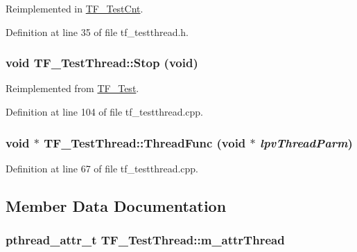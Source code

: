 Reimplemented in \hyperlink{classTF__TestCnt_ac1a136199115958172e96ef4c9212351}{TF\_\-TestCnt}.

Definition at line 35 of file tf\_\-testthread.h.\hypertarget{classTF__TestThread_a3a633a8999b704e85bb197b5fdd63b43}{
\subsubsection[{Stop}]{\setlength{\rightskip}{0pt plus 5cm}void TF\_\-TestThread::Stop (void)}}
\label{classTF__TestThread_a3a633a8999b704e85bb197b5fdd63b43}


Reimplemented from \hyperlink{classTF__Test_a710a0463dee6767fcb3a3e3d191978b7}{TF\_\-Test}.

Definition at line 104 of file tf\_\-testthread.cpp.\hypertarget{classTF__TestThread_a9ba6692148ce51f4bbfff8f408479c1f}{
\subsubsection[{ThreadFunc}]{\setlength{\rightskip}{0pt plus 5cm}void $\ast$ TF\_\-TestThread::ThreadFunc (void $\ast$ {\em lpvThreadParm})}}
\label{classTF__TestThread_a9ba6692148ce51f4bbfff8f408479c1f}


Definition at line 67 of file tf\_\-testthread.cpp.

\subsection{Member Data Documentation}
\hypertarget{classTF__TestThread_a111456494b43af46290cccae56efd170}{
\subsubsection[{m\_\-attrThread}]{\setlength{\rightskip}{0pt plus 5cm}pthread\_\-attr\_\-t {\bf TF\_\-TestThread::m\_\-attrThread}}}
\label{classTF__TestThread_a111456494b43af46290cccae56efd170}


